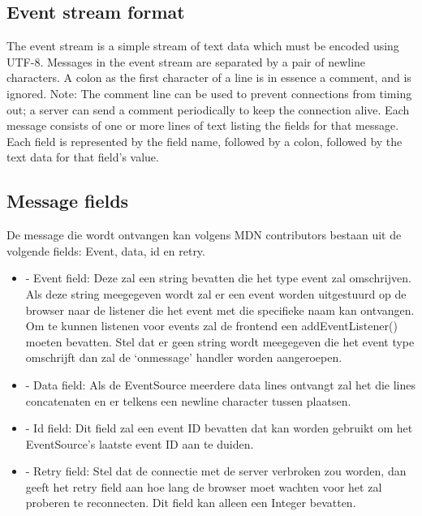 \subsection{Event stream format}
The event stream is a simple stream of text data which must be encoded using UTF-8. Messages in the event stream are separated by a pair of newline characters. A colon as the first character of a line is in essence a comment, and is ignored.
Note: The comment line can be used to prevent connections from timing out; a server can send a comment periodically to keep the connection alive.
Each message consists of one or more lines of text listing the fields for that message. Each field is represented by the field name, followed by a colon, followed by the text data for that field's value.

\subsection{Message fields}
De message die wordt ontvangen kan volgens MDN contributors bestaan uit de volgende fields: Event, data, id en retry.
\begin{itemize}
    \item -	Event field: Deze zal een string bevatten die het type event zal omschrijven. Als deze string meegegeven wordt zal er een event worden uitgestuurd op de browser naar de listener die het event met die specifieke naam kan ontvangen. Om te kunnen listenen voor events zal de frontend een addEventListener() moeten bevatten. Stel dat er geen string wordt meegegeven die het event type omschrijft dan zal de ‘onmessage’ handler worden aangeroepen.
    \item -	Data field: Als de EventSource meerdere data lines ontvangt zal het die lines concatenaten en er telkens een newline character tussen plaatsen.
    \item -	Id field: Dit field zal een event ID bevatten dat kan worden gebruikt om het EventSource’s laatste event ID aan te duiden.
    \item -	Retry field: Stel dat de connectie met de server verbroken zou worden, dan geeft het retry field aan hoe lang de browser moet wachten voor het zal proberen te reconnecten. Dit field kan alleen een Integer bevatten.
\end{itemize}